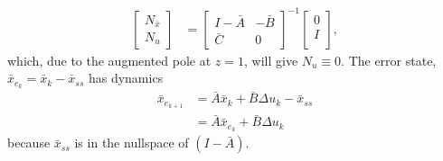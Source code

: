 \documentclass[twocolumn,twoside]{IEEEtran}
\newcommand{\Ad}{\ensuremath{\bar A }\xspace}
\newcommand{\Bd}{\ensuremath{\bar B }\xspace}
\newcommand{\Cd}{\ensuremath{\bar C }\xspace}
\newcommand{\xd}{\ensuremath{\bar x }\xspace}
\newcommand{\xdss}{\ensuremath{\bar x_{ss} }\xspace}
\newcommand{\dd}{\ensuremath{\Delta }\xspace}
\begin{document}
\begin{align}
  \begin{bmatrix}N_{\xd} \\ N_u\end{bmatrix} &=
\begin{bmatrix}I-\Ad & -\Bd\\\Cd & 0\end{bmatrix}^{-1}\begin{bmatrix}0\\ I\\\end{bmatrix}\label{eqn:nxnu},
\end{align}
which, due to the augmented pole at $z=1$, will give \(N_u\equiv 0\). 
The error state, \({\xd_{e_k}=\xd_k - \xdss}\) has dynamics
\begin{align}
  \xd_{e_{k+1}} & = \Ad\xd_k + \Bd\dd u_k - \xdss \nonumber\\
            & = \Ad \xd_{e_k}   + \Bd \dd u_k\nonumber
\end{align}
              because $\xdss$ is in the nullspace of $(I - \Ad)$.
              
\end{document}

